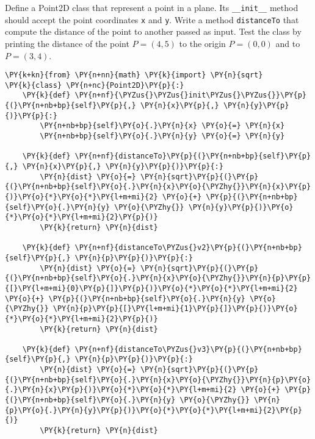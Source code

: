 \begin{Exercise}
Define a Point2D class that represent a point in a plane. Its \texttt{\_\_init\_\_} method should accept the point coordinates \texttt{x} and \texttt{y}. Write a method \texttt{distanceTo} that compute the distance of the point to another passed as input. Test the class by printing the distance of the point \(P=(4, 5)\) to the origin \(P=(0,0)\) and to \(P=(3,4)\).
\end{Exercise}

\begin{Answer}
\begin{tcolorbox}[size=fbox, boxrule=1pt, colback=cellbackground, colframe=cellborder]
\begin{Verbatim}[commandchars=\\\{\}]
\PY{k+kn}{from} \PY{n+nn}{math} \PY{k}{import} \PY{n}{sqrt}
\PY{k}{class} \PY{n+nc}{Point2D}\PY{p}{:}
    \PY{k}{def} \PY{n+nf}{\PYZus{}\PYZus{}init\PYZus{}\PYZus{}}\PY{p}{(}\PY{n+nb+bp}{self}\PY{p}{,} \PY{n}{x}\PY{p}{,} \PY{n}{y}\PY{p}{)}\PY{p}{:}
        \PY{n+nb+bp}{self}\PY{o}{.}\PY{n}{x} \PY{o}{=} \PY{n}{x}
        \PY{n+nb+bp}{self}\PY{o}{.}\PY{n}{y} \PY{o}{=} \PY{n}{y}

    \PY{k}{def} \PY{n+nf}{distanceTo}\PY{p}{(}\PY{n+nb+bp}{self}\PY{p}{,} \PY{n}{x}\PY{p}{,} \PY{n}{y}\PY{p}{)}\PY{p}{:}
        \PY{n}{dist} \PY{o}{=} \PY{n}{sqrt}\PY{p}{(}\PY{p}{(}\PY{n+nb+bp}{self}\PY{o}{.}\PY{n}{x}\PY{o}{\PYZhy{}}\PY{n}{x}\PY{p}{)}\PY{o}{*}\PY{o}{*}\PY{l+m+mi}{2} \PY{o}{+} \PY{p}{(}\PY{n+nb+bp}{self}\PY{o}{.}\PY{n}{y} \PY{o}{\PYZhy{}} \PY{n}{y}\PY{p}{)}\PY{o}{*}\PY{o}{*}\PY{l+m+mi}{2}\PY{p}{)}
        \PY{k}{return} \PY{n}{dist}

    \PY{k}{def} \PY{n+nf}{distanceTo\PYZus{}v2}\PY{p}{(}\PY{n+nb+bp}{self}\PY{p}{,} \PY{n}{p}\PY{p}{)}\PY{p}{:}
        \PY{n}{dist} \PY{o}{=} \PY{n}{sqrt}\PY{p}{(}\PY{p}{(}\PY{n+nb+bp}{self}\PY{o}{.}\PY{n}{x}\PY{o}{\PYZhy{}}\PY{n}{p}\PY{p}{[}\PY{l+m+mi}{0}\PY{p}{]}\PY{p}{)}\PY{o}{*}\PY{o}{*}\PY{l+m+mi}{2} \PY{o}{+} \PY{p}{(}\PY{n+nb+bp}{self}\PY{o}{.}\PY{n}{y} \PY{o}{\PYZhy{}} \PY{n}{p}\PY{p}{[}\PY{l+m+mi}{1}\PY{p}{]}\PY{p}{)}\PY{o}{*}\PY{o}{*}\PY{l+m+mi}{2}\PY{p}{)}
        \PY{k}{return} \PY{n}{dist}

    \PY{k}{def} \PY{n+nf}{distanceTo\PYZus{}v3}\PY{p}{(}\PY{n+nb+bp}{self}\PY{p}{,} \PY{n}{p}\PY{p}{)}\PY{p}{:}
        \PY{n}{dist} \PY{o}{=} \PY{n}{sqrt}\PY{p}{(}\PY{p}{(}\PY{n+nb+bp}{self}\PY{o}{.}\PY{n}{x}\PY{o}{\PYZhy{}}\PY{n}{p}\PY{o}{.}\PY{n}{x}\PY{p}{)}\PY{o}{*}\PY{o}{*}\PY{l+m+mi}{2} \PY{o}{+} \PY{p}{(}\PY{n+nb+bp}{self}\PY{o}{.}\PY{n}{y} \PY{o}{\PYZhy{}} \PY{n}{p}\PY{o}{.}\PY{n}{y}\PY{p}{)}\PY{o}{*}\PY{o}{*}\PY{l+m+mi}{2}\PY{p}{)}
        \PY{k}{return} \PY{n}{dist}


\end{Verbatim}
\end{tcolorbox}
\end{Answer}
